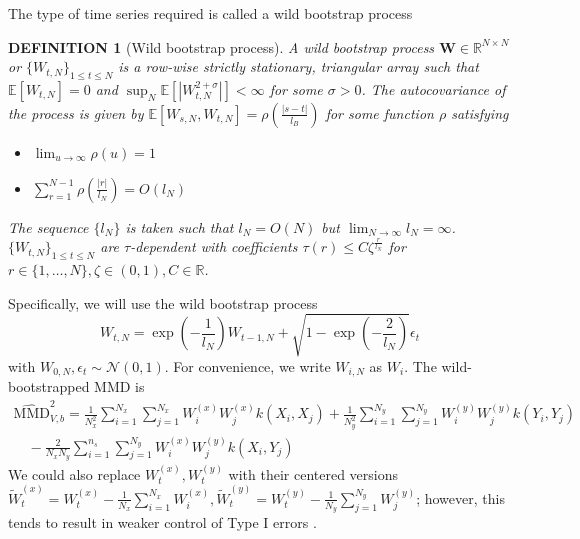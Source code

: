 \documentclass[a4paper,11pt]{article}
\newtheorem{definition}[theorem]{DEFINITION}
\newcommand{\E}{\mathbb{E}}
\begin{document}
The type of time series required is called a wild bootstrap process
\begin{definition}[Wild bootstrap process]
A wild bootstrap process $\mathbf{W} \in \mathbb{R}^{N \times N}$ or $\{W_{t, N}\}_{1 \leq t \leq N}$ is a row-wise strictly stationary, triangular array such that $\E[W_{t,N}] = 0$ and $\sup_{N} \E[|W_{t,N}^{2+\sigma}|]<\infty$ for some $\sigma > 0$. The autocovariance of the process is given by $\E[W_{s,N}, W_{t,N}] = \rho(\frac{|s-t|}{l_{B}})$ for some function $\rho$ satisfying 
\begin{itemize}
    \item $\lim_{u\rightarrow\infty} \rho(u)=1$
    \item $\sum_{r=1}^{N-1} \rho(\frac{|r|}{l_{N}}) = O(l_{N})$
\end{itemize}
The sequence $\{l_{N}\}$ is taken such that $l_{N}=O(N)$ but $\lim_{N\rightarrow \infty}l_{N} = \infty$. $\{W_{t, N}\}_{1 \leq t \leq N}$ are $\tau$-dependent with coefficients $\tau(r) \leq C\zeta^{\frac{r}{l_{N}}}$ for $r \in \{1, \ldots, N\}, \zeta \in (0,1), C \in \mathbb{R}$.
\end{definition}
Specifically, we will use the wild bootstrap process
\begin{equation}
    W_{t, N}=\exp{\left(-\frac{1}{l_{N}}\right)} W_{t-1, N}+\sqrt{1-\exp{\left(-\frac{2}{l_{N}}\right)}} \epsilon_{t}
    \label{eq:wb_process}
\end{equation}
with $W_{0,N}, \epsilon_{t} \sim \mathcal{N}(0,1)$. For convenience, we write $W_{i,N}$ as $W_{i}$. The wild-bootstrapped MMD is
\begin{equation}
\begin{array}{c}
\widehat{\mathrm{MMD}}^{2}_{V, b}=\frac{1}{N_{x}^{2}} \sum_{i=1}^{N_{x}} \sum_{j=1}^{N_{x}} W_{i}^{(x)} W_{j}^{(x)} k\left(X_{i}, X_{j}\right)+\frac{1}{N_{y}^{2}} \sum_{i=1}^{N_{y}} \sum_{j=1}^{N_{y}} W_{i}^{(y)} W_{j}^{(y)} k\left(Y_{i}, Y_{j}\right) \\
\quad-\frac{2}{N_{x} N_{y}} \sum_{i=1}^{n_{s}} \sum_{j=1}^{N_{y}} W_{i}^{(x)} W_{j}^{(y)} k\left(X_{i}, Y_{j}\right)
\end{array}
\label{eq:wb_mmd}
\end{equation}
We could also replace $W_{t}^{(x)}, W_{t}^{(y)}$ with their centered versions $\tilde{W}_{t}^{(x)}=W_{t}^{(x)}-\frac{1}{N_{x}} \sum_{i=1}^{N_{x}} W_{i}^{(x)}, \tilde{W}_{t}^{(y)}=W_{t}^{(y)}-\frac{1}{N_{y}} \sum_{j=1}^{N_{y}} W_{j}^{(y)}$; however, this tends to result in weaker control of Type I errors \cite{chwialkowski_wild_2016}.
\end{document}
